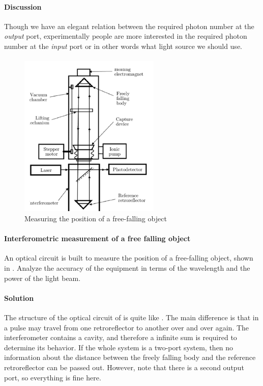\documentclass[hyperref, a4paper]{article}
\begin{document}
\paragraph{Discussion} Though we have an elegant relation between the required photon number at the \emph{output} port, 
experimentally people are more interested in the required photon number at the \emph{input} port or in other words what light source we should use.

\paragraph{}

\begin{figure}
    \centering
    \includegraphics[width=0.6\textwidth]{free-fall.png}
    \caption{Measuring the position of a free-falling object}
    \label{fig:free-fall}
\end{figure}

\paragraph{Interferometric measurement of a free falling object} An optical circuit is built to measure the position of a free-falling object, shown in .
Analyze the accuracy of the equipment in terms of the wavelength and the power of the light beam.

\paragraph{Solution} The structure of the optical circuit of  is quite like .
The main difference is that in  a pulse may travel from one retroreflector to another over and over again.
The interferometer contains a cavity, and therefore a infinite sum is required to determine its behavior.
If the whole system is a two-port system, then no information about the distance between the freely falling body and the reference retroreflector can be passed out.
However, note that there is a second output port, so everything is fine here.
\end{document}

